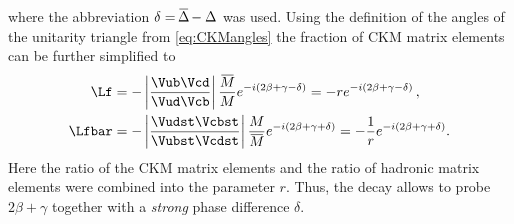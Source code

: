 where the abbreviation $\delta=\overline{\kern -1.0pt \Delta\kern -1.0pt}-\Delta$ was used.
Using the definition of the angles of the unitarity triangle from \cref{eq:CKMangles} the fraction of CKM matrix elements can be further simplified to
\begin{align}
\Lf&=-\left|\frac{\Vub\Vcd}{\Vud\Vcb}\right|\frac{\overline{\kern -1.0pt M\kern -1.0pt}}{M}e^{-i\left(2\beta+\gamma-\delta\right)}=-re^{-i\left(2\beta+\gamma-\delta\right)}\,,\\
\Lfbar&=-\left|\frac{\Vudst\Vcbst}{\Vubst\Vcdst}\right|\frac{M}{\overline{\kern -1.0pt M\kern -1.0pt}}e^{-i\left(2\beta+\gamma+\delta\right)}=-\frac{1}{r}e^{-i\left(2\beta+\gamma+\delta\right)}.
\end{align}
Here the ratio of the CKM matrix elements and the ratio of hadronic matrix elements were combined into the parameter $r$.
Thus, the decay allows to probe $2\beta+\gamma$ together with a \emph{strong} phase difference $\delta$.

